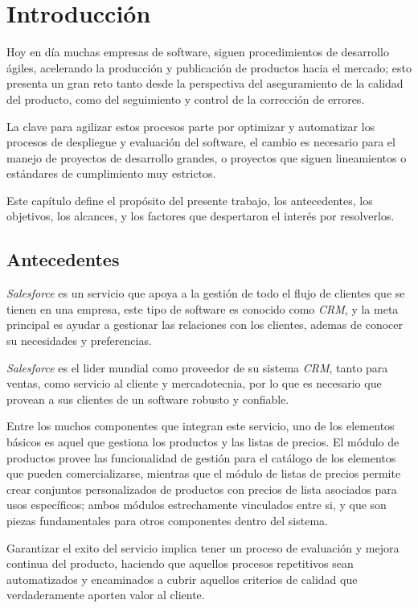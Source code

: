\chapter{Introducción}

Hoy en día muchas empresas de software, siguen procedimientos de desarrollo
ágiles, acelerando la producción y publicación de productos hacia el mercado;
esto presenta un gran reto tanto desde la perspectiva del aseguramiento de la
calidad del producto, como del seguimiento y control de la corrección de
errores.

La clave para agilizar estos procesos parte por optimizar y automatizar los
procesos de despliegue y evaluación del software, el cambio es necesario para
el manejo de proyectos de desarrollo grandes, o proyectos que siguen
lineamientos o estándares de cumplimiento muy estrictos.

Este capítulo define el propósito del presente trabajo, los antecedentes, los
objetivos, los alcances, y los factores que despertaron el interés por
resolverlos.

\section{Antecedentes}
\emph{Salesforce} es un servicio que apoya a la gestión de todo el flujo de
clientes que se tienen en una empresa, este tipo de software es conocido como
\emph{CRM}, y la meta principal es ayudar a gestionar las relaciones con los
clientes, ademas de conocer su necesidades y preferencias.

\emph{Salesforce} es el lider mundial como proveedor de su sistema \emph{CRM},
tanto para ventas, como servicio al cliente y mercadotecnia, por lo que es
necesario que provean a sus clientes de un software robusto y confiable.

Entre los muchos componentes que integran este servicio, uno de los elementos
básicos es aquel que gestiona los productos y las listas de precios. El módulo
de productos provee las funcionalidad de gestión para el catálogo de
los elementos que pueden comercializarse, mientras que el módulo de listas de
precios permite crear conjuntos personalizados de productos con precios de
lista asociados para usos específicos; ambos módulos estrechamente vinculados
entre si, y que son piezas fundamentales para otros componentes dentro del
sistema.

Garantizar el exito del servicio implica tener un proceso de evaluación y
mejora continua del producto, haciendo que aquellos procesos repetitivos sean
automatizados y encaminados a cubrir aquellos criterios de calidad que
verdaderamente aporten valor al cliente.

